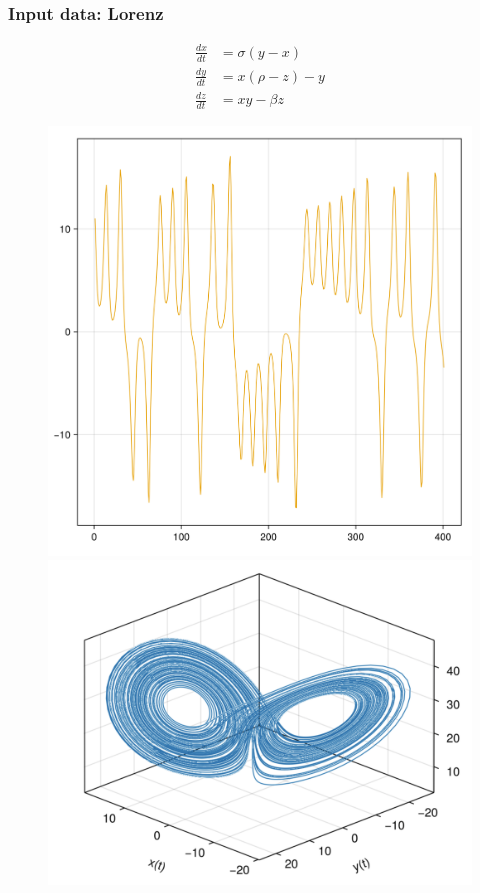 \documentclass{beamer}
\begin{document}
\begin{frame}
    \frametitle{Input data: Lorenz}

    \[
    \begin{aligned}
        \frac{dx}{dt} &= \sigma (y - x) \\
        \frac{dy}{dt} &= x (\rho - z) - y \\
        \frac{dz}{dt} &= xy - \beta z
    \end{aligned}
    \]

    \begin{figure}
        \centering
        \begin{minipage}{0.5\textwidth}
            \centering
            \includegraphics[width=\textwidth]{Lorenz_component.png}
        \end{minipage}%
        \begin{minipage}{0.5\textwidth}
            \centering
            \includegraphics[width=\textwidth]{Lorenz_3d.png}

\end{minipage}
\end{figure}
\end{frame}
\end{document}
